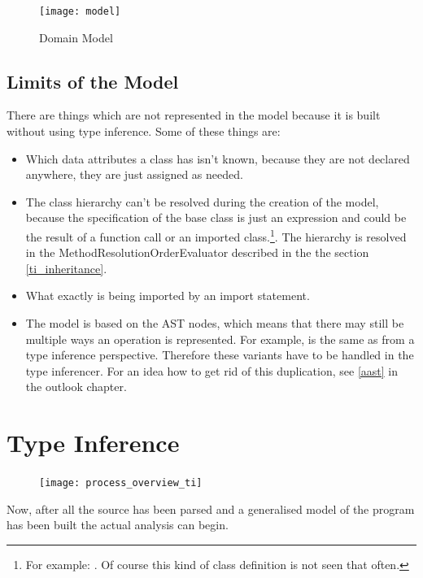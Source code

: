 \documentclass[12pt,halfparskip,DIV11,BCOR10mm]{scrreprt}
\begin{document}
\begin{figure}[H]
    \centering
    \texttt{[image: model]}
    \caption{Domain Model}
    \label{fig:model}
\end{figure}

\section{Limits of the Model}

There are things which are not represented in the model because it is built without using type inference. Some of these things are:

\begin{itemize}
    \item Which data attributes a class has isn't known, because they are not declared anywhere, they are just assigned as needed.
    \item The class hierarchy can't be resolved during the creation of the model, because the specification of the base class is just an expression and could be the result of a function call or an imported class.\footnote{
    For example: . Of course this kind of class definition is not seen that often.}. The hierarchy is resolved in the MethodResolutionOrderEvaluator described in the the section \vref{ti_inheritance}.
    \item What exactly is being imported by an import statement.
    \item The model is based on the AST nodes, which means that there may still be multiple ways an operation is represented. For example,  is the same as  from a type inference perspective. Therefore these variants have to be handled in the type inferencer. For an idea how to get rid of this duplication, see \vref{aast} in the outlook chapter.
\end{itemize}


\chapter{Type Inference}

\begin{figure}
    \vspace{-0.6cm}
    \texttt{[image: process\_overview\_ti]}
\end{figure}

Now, after all the source has been parsed and a generalised model of the program has been built the actual analysis can begin. 
\end{document}

